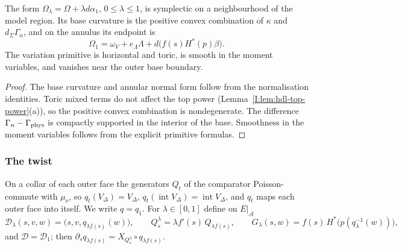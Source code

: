 \begin{proposition}\label{prop:hdl-first-path}
The form $\Omega_\lambda=\Omega+\lambda d\alpha_1$, $0\le\lambda\le1$, is symplectic on a
neighbourhood of the model region. Its base curvature is the positive convex combination of
$\kappa$ and $d_\Sigma\Gamma_n$, and on the annulus its endpoint is
\[
 \Omega_1=\omega_V+e_\Lambda\Lambda+d\big(f(s)H^*(p)\beta\big).
\]
The variation primitive is horizontal and toric, is smooth in the moment variables, and vanishes
near the outer base boundary.
\end{proposition}

\begin{proof}
The base curvature and annular normal form follow from the normalisation identities. Toric mixed terms do not affect the top power (Lemma~\ref{I:lem:hdl-top-power}(a)), so the positive convex combination is nondegenerate. The difference $\Gamma_n-\Gamma_{\rm phys}$ is compactly supported in the interior of the base. Smoothness in the moment variables follows from the explicit primitive formulas.
\end{proof}


\subsubsection{The twist}\label{I:sec:hdl-twist}
On a collar of each outer face the generators $Q_t$ of the comparator Poisson-commute with $\mu_\nu$, so
$q_t(V_\Delta)=V_\Delta$, $q_t(\operatorname{int}V_\Delta)=\operatorname{int}V_\Delta$, and $q_t$ maps each outer face into itself.
We write $q=q_1$. For $\lambda\in[0,1]$ define on $E|_{\mathcal A}$
\begin{equation}\label{I:eq:hdl-twist}
 \mathcal D_\lambda(s,v,w)=\big(s,v,q_{\lambda f(s)}(w)\big),\qquad
 Q^\lambda_s=\lambda f'(s)\,Q_{\lambda f(s)},\qquad
 G_\lambda(s,w)=f(s)\,H^*\big(p(q_\lambda^{-1}(w))\big),
\end{equation}
and $\mathcal D=\mathcal D_1$; then $\partial_sq_{\lambda f(s)}=X_{Q^\lambda_s}\circ q_{\lambda f(s)}$.

